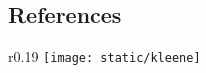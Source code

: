 %  
%  
%  
%  
%  
%  
%  
%  
%  
%  
%  



\subsection{References}

\setlength{\intextsep}{0pt}
\begin{wrapfigure}[8]{r}{0.19\textwidth}
\texttt{[image: static/kleene]}
\end{wrapfigure}


